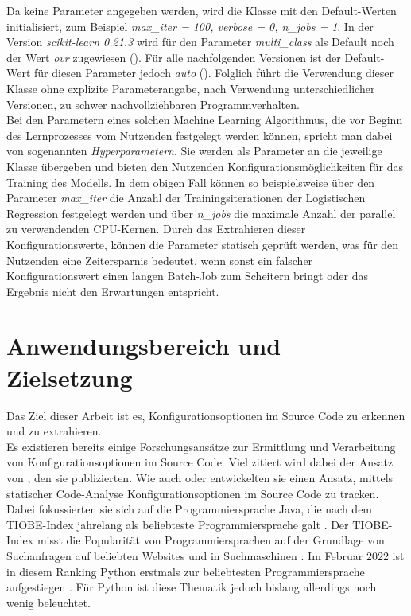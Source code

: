 \documentclass[german,bachelor]{swsLeipzig}
\begin{document}
Da keine Parameter angegeben werden, wird die Klasse mit den Default-Werten initialisiert, zum Beispiel
\textit{max\_iter = 100, verbose = 0, n\_jobs = 1}.
In der Version \textit{scikit-learn 0.21.3} wird für den Parameter \textit{multi\_class} als Default noch der Wert \textit{ovr} zugewiesen (\citeyear{sklearn}).
Für alle nachfolgenden Versionen ist der Default-Wert für diesen Parameter jedoch \textit{auto} (\citeyear{sklearn}).
Folglich führt die Verwendung dieser Klasse ohne explizite Parameterangabe, nach Verwendung unterschiedlicher Versionen, zu schwer nachvollziehbaren Programmverhalten.\\

Bei den Parametern eines solchen Machine Learning Algorithmus, die vor Beginn des Lernprozesses vom Nutzenden festgelegt werden können,
spricht man dabei von sogenannten \textit{Hyperparametern}.
Sie werden als Parameter an die jeweilige Klasse übergeben und bieten den Nutzenden Konfigurationsmöglichkeiten für
das Training des Modells.
In dem obigen Fall können so beispielsweise über den Parameter \textit{max\_iter} die Anzahl der Trainingsiterationen
der Logistischen Regression festgelegt werden und über \textit{n\_jobs} die maximale Anzahl der parallel zu verwendenden CPU-Kernen.
Durch das Extrahieren dieser Konfigurationswerte, können die Parameter statisch geprüft werden, was für den Nutzenden
eine Zeitersparnis bedeutet, wenn sonst ein falscher Konfigurationswert einen langen Batch-Job zum Scheitern bringt
oder das Ergebnis nicht den Erwartungen entspricht. \\



\section{Anwendungsbereich und Zielsetzung}
Das Ziel dieser Arbeit ist es, Konfigurationsoptionen im Source Code zu erkennen und zu extrahieren. \\

Es existieren bereits einige Forschungsansätze zur Ermittlung und Verarbeitung von Konfigurationsoptionen im Source Code.
Viel zitiert wird dabei der Ansatz von \citeauthor{10.1145/1985793.1985812}, den sie \citeyear{10.1145/1985793.1985812} publizierten.
Wie auch \citeauthor{7774519} oder \citeauthor{8049300} entwickelten sie einen Ansatz, mittels statischer Code-Analyse Konfigurationsoptionen
im Source Code zu tracken.
Dabei fokussierten sie sich auf die Programmiersprache Java, die nach dem TIOBE-Index jahrelang als beliebteste Programmiersprache galt \cite[]{enwiki:1077809155}.
Der TIOBE-Index misst die Popularität von Programmiersprachen auf der Grundlage von Suchanfragen auf beliebten Websites und in Suchmaschinen \cite[]{enwiki:1077809155}.
Im Februar 2022 ist in diesem Ranking Python erstmals zur beliebtesten Programmiersprache aufgestiegen \cite[]{enwiki:1077809155}.
Für Python ist diese Thematik jedoch bislang allerdings noch wenig beleuchtet. \\
\end{document}
